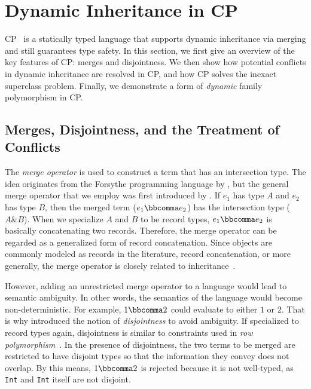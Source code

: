 \section{Dynamic Inheritance in CP} \label{sec:overview}

CP~\citep{zhang2021compositional} is a statically typed language that supports
dynamic inheritance via merging and still guarantees type safety. In this
section, we first give an overview of the key features of CP: merges and
disjointness. We then show how potential conflicts in dynamic inheritance
are resolved in CP, and how CP solves the inexact superclass problem.
Finally, we demonstrate a form of \emph{dynamic} family
polymorphism in CP.

\subsection{Merges, Disjointness, and the Treatment of Conflicts}\label{sec:merge}

The \emph{merge operator} is used to construct a term that has an intersection
type. The idea originates from the Forsythe programming language by
\citet{reynolds1997design}, but the general merge operator that we employ was
first introduced by \citet{dunfield2014elaborating}. If $e_1$ has type $A$ and
$e_2$ has type $B$, then the merged term ($e_1 \bbcomma e_2$) has the
intersection type ($A\&B$). When we specialize $A$ and $B$ to be record types,
$e_1 \bbcomma e_2$ is basically concatenating two records. Therefore, the merge
operator can be regarded as a generalized form of record concatenation. Since
objects are commonly modeled as records in the literature, record concatenation,
or more generally, the merge operator is closely related to
inheritance~\citep{wand1991type,cook1989denotational}.

However, adding an unrestricted merge operator to a language would lead to
semantic ambiguity. In other words, the semantics of the language would become
non-deterministic. For example, $1\bbcomma2$ could evaluate to either $1$ or
$2$. That is why \citet{oliveira2016disjoint} introduced the notion of
\emph{disjointness} to avoid ambiguity. If specialized to record types again,
disjointness is similar to constraints used in \emph{row
polymorphism}~\citep{harper1991record}. In the presence of disjointness, the two
terms to be merged are restricted to have disjoint types so that the information
they convey does not overlap. By this means, $1\bbcomma2$ is rejected because it
is not well-typed, as \lstinline{Int} and \lstinline{Int} itself are not
disjoint.

